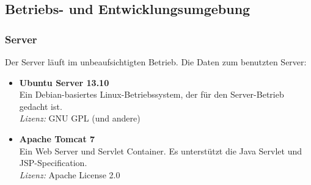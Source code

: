 \subsection{Betriebs- und Entwicklungsumgebung}


\subsubsection{Server}
Der Server läuft im unbeaufsichtigten Betrieb. Die Daten zum benutzten Server:
\begin{itemize}
	\item \textbf{Ubuntu Server 13.10} \\
	Ein Debian-basiertes Linux-Betriebssystem, der für den Server-Betrieb gedacht ist. \\
	\textit{Lizenz:} GNU GPL (und andere)
	\item \textbf{Apache Tomcat 7} \\
	Ein Web Server und Servlet Container. Es unterstützt die Java Servlet  und JSP-Specification. \\
	\textit{Lizenz:} Apache License 2.0
\end{itemize}

